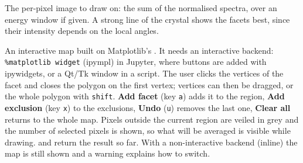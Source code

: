 The per-pixel image to draw on: the sum of the normalised spectra, over an energy window if
given. A strong line of the crystal shows the facets best, since their intensity depends on
the local angles.

An interactive map built on Matplotlib's . It needs an interactive backend:
\texttt{\%matplotlib widget} (ipympl) in Jupyter, where buttons are added with ipywidgets, or a
Qt/Tk window in a script. The user clicks the vertices of the facet and closes the polygon on
the first vertex; vertices can then be dragged, or the whole polygon with \texttt{shift}.
\textbf{Add facet} (key \texttt{a}) adds it to the region, \textbf{Add exclusion} (key
\texttt{x}) to the exclusions, \textbf{Undo} (\texttt{u}) removes the last one, \textbf{Clear
all} returns to the whole map. Pixels outside the current region are veiled in grey and the
number of selected pixels is shown, so what will be averaged is visible while drawing.
 and  return the result so far. With a non-interactive backend (inline)
the map is still shown and a warning explains how to switch.
